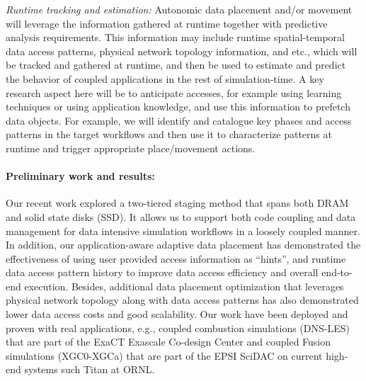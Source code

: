 {\em Runtime tracking and estimation:}
Autonomic data placement and/or movement will leverage the information gathered at runtime together with predictive analysis requirements. This information may include runtime spatial-temporal data access patterns, physical network topology information, and etc., which will be tracked and gathered at runtime, and then be used to estimate and predict the behavior of coupled applications in the rest of simulation-time. A key research aspect here will be to anticipate accesses, for example using learning techniques or using application knowledge, and use this information to prefetch data objects. For example, we will identify and catalogue key phases and access patterns in the target workflows and then use it to characterize patterns at runtime and trigger appropriate place/movement actions. 

\paragraph{Preliminary work and results:} Our recent work \cite{tongipdps15} explored a two-tiered staging method that spans both DRAM and solid state disks (SSD).  It allows us to support both code coupling and data management for data intensive simulation workflows in a loosely coupled manner. In addition, our application-aware adaptive data placement has demonstrated the effectiveness of using user provided access information as ``hints'', and runtime data access pattern history to improve data access efficiency and overall end-to-end execution. Besides, additional data placement optimization \cite{qiansc15} that leverages physical network topology along with data access patterns has also demonstrated lower data access costs and good scalability. Our work have been deployed and proven with real applications, e.g., coupled combustion simulations (DNS-LES) that are part of the ExaCT Exascale Co-design Center and coupled Fusion simulations (XGC0-XGCa) that are part of the EPSI SciDAC on current high-end systems such Titan at ORNL. 